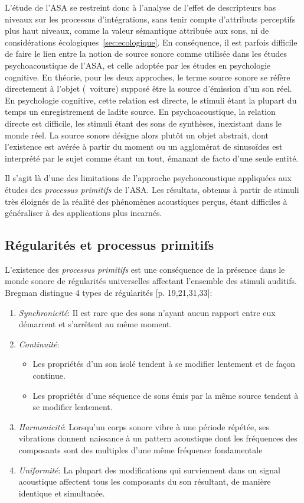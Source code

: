 L'étude de l'ASA se restreint donc à l'analyse de l'effet de descripteurs bas niveaux sur les processus d'intégrations, sans tenir compte d'attributs perceptifs plus haut niveaux, comme la valeur sémantique attribuée aux sons, ni de considérations écologiques~\ref{sec:ecologique}. En conséquence, il est parfois difficile de faire le lien entre la notion de source sonore comme utilisée dans les études psychoacoustique de l'ASA, et celle adoptée par les études en psychologie cognitive. En théorie, pour les deux approches, le terme source sonore se réfère directement à l'objet (\eg~voiture) supposé être la source d'émission d'un son réel. En psychologie cognitive, cette relation est directe, le stimuli étant la plupart du temps un enregistrement de ladite source. En psychoacoustique, la relation directe est difficile, les stimuli étant des sons de synthèses, inexistant dans le monde réel. La source sonore désigne alors plutôt un objet abstrait, dont l’existence est avérée à partir du moment ou un agglomérat de sinusoïdes est interprété par le sujet comme étant un tout, émanant de facto d'une seule entité. 

Il s'agit là d'une des limitations de l'approche psychoacoustique appliquées aux études des  \emph{processus primitifs} de l'ASA. Les résultats, obtenus à partir de stimuli très éloignés de la réalité des phénomènes acoustiques perçus, étant difficiles à généraliser à des applications plus incarnés.

\subsection{Régularités et processus primitifs}

L'existence des \emph{processus primitifs} est une conséquence de la présence dans le monde sonore de régularités universelles affectant l'ensemble des stimuli auditifs. Bregman distingue 4 types de régularités [p. 19,21,31,33]\citep{mcadams1994penser}:

\begin{enumerate}
\item \emph{Synchronicité}: Il est rare que des sons n'ayant aucun rapport entre eux démarrent et s'arrêtent au même moment.
\item \emph{Continuité}: 
\begin{itemize}
\item Les propriétés d'un son isolé tendent à se modifier lentement et de façon continue.
\item Les propriétés d'une séquence de sons émis par la même source tendent à se modifier lentement.
\end{itemize}
\item \emph{Harmonicité}: Lorsqu'un corps sonore vibre à une période répétée, ses vibrations donnent naissance à un pattern acoustique dont les fréquences des composants sont des multiples d'une même fréquence fondamentale
\item \emph{Uniformité}: La plupart des modifications qui surviennent dans un signal acoustique affectent tous les composants du son résultant, de manière identique et simultanée.
\end{enumerate}

